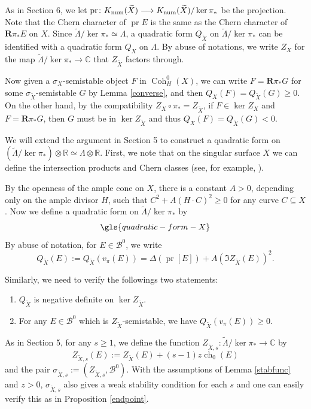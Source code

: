 \documentclass[12pt]{amsart}
\theoremstyle{definition}
\DeclareMathOperator{\Coh}{Coh}
\DeclareMathOperator{\num}{num}
\DeclareMathOperator{\ch}{ch}
\DeclareMathOperator{\pr}{pr}
\begin{document}
As in Section 6, we let $\pr \colon {\rm K}_{\num}(\widetilde{X}) \longrightarrow {\rm K}_{\num}(\widetilde{X})/\ker\pi_\ast$ be the projection. 
Note that the Chern character of $\pr E$ is the same as the Chern character of $\mathbf{R}\pi_\ast E$
on $X$.
Since $\widetilde{\Lambda}/ \ker \pi_\ast \simeq \Lambda$, a quadratic form $Q_{\widetilde{X}}$ on $\widetilde{\Lambda}/ \ker \pi_\ast$ can be identified with a quadratic form $Q_X$ on $\Lambda$.
By abuse of notations, we write $Z_X$ for the map $\widetilde{\Lambda}/ \ker \pi_\ast \longrightarrow \mathbb{C}$ that $Z_{\widetilde{X}}$ factors through.

Now given a $\sigma_X$-semistable object $F$ in $\Coh^0_H(X)$,
we can write $F= \mathbf{R} \pi_\ast G$ for some $\sigma_{\widetilde{X}}$-semistable $G$ by Lemma \ref{converse},
and then $Q_X(F)=Q_{\widetilde{X}}(G) \geq 0$.
On the other hand, by the compatibility $Z_X \circ \pi_\ast = Z_{\widetilde{X}}$, 
if $F \in \ker Z_X$
and $F= \mathbf{R} \pi_\ast G$,
then $G$ must be in $\ker Z_{\widetilde{X}}$ and thus $Q_X(F) = Q_{\widetilde{X}}(G) < 0$.


We will extend the argument in Section 5 to construct a quadratic form on $(\widetilde{\Lambda}/ \ker \pi_\ast) \otimes \mathbb{R} \simeq \Lambda \otimes \mathbb{R}$.
First, we note that on the singular surface $X$ we can define the intersection products and Chern classes (see, for example, \cite{Lan25}).

By the openness of the ample cone on $X$, there is a constant $A>0$, 
depending only on the ample divisor $H$, such that $ C^2 + A(H \cdot C)^2 \geq 0$ for any curve $C \subseteq X$.
Now we define a quadratic form on $\widetilde{\Lambda}/ \ker \pi_\ast$ by
\begin{equation}
\gls{quadratic-form-X}
\end{equation}
By abuse of notation, for $E \in \mathcal{B}^0$, we write \[Q_{\widetilde{X}}(E):= Q_{\widetilde{X}}(v_\pi(E)) = \Delta(\pr [E]) + A(\Im Z_{\widetilde{X}}(E))^2.\]

Similarly, we need to verify the followings two statements:
\begin{enumerate}
    \item $Q_{\widetilde{X}}$ is negative definite on $\ker Z_{\widetilde{X}}$.
    \item For any $E \in \mathcal{B}^0$ which is $Z_{\widetilde{X}}$-semistable, we have $Q_{\widetilde{X}}(v_\pi(E)) \geq 0$.
\end{enumerate}

As in Section 5, for any $s\geq 1$, we define the function $Z_{\widetilde{X},s}\colon \widetilde{\Lambda}/ \ker \pi_\ast \longrightarrow \mathbb{C}$ by 
\[Z_{\widetilde{X},s}(E):= Z_{\widetilde{X}}(E) + (s-1) z \ch_0(E)\]
and the pair $\sigma_{\widetilde{X},s}:=(Z_{\widetilde{X},s},\mathcal{B}^0)$.
With the assumptions of Lemma \ref{stabfunc} and $z>0$,
$\sigma_{\widetilde{X},s}$ also gives a weak stability condition for each $s$ and one can easily verify this as in Proposition \ref{endpoint}.
\end{document}
